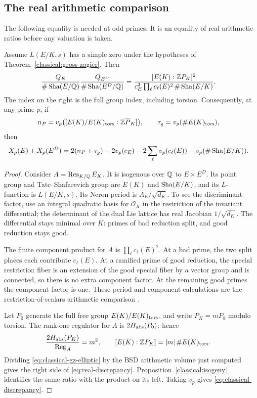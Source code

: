 \subsection{The real arithmetic comparison}

The following equality is needed at odd primes. It is an equality
of real arithmetic ratios before any valuation is taken.

\begin{proposition}
\label{classical:discrepancy-identity}
Assume $L(E/K,s)$ has a simple zero under the hypotheses of
Theorem~\ref{classical:gross-zagier}. Then
\begin{equation}\label{eq:real-discrepancy}
 \frac{Q_E}{\#\operatorname{Sha}(E/\mathbb Q)}
 \frac{Q_{E^D}}{\#\operatorname{Sha}(E^D/\mathbb Q)}
 =\frac{[E(K):\mathbb Z P_K]^2}
 {c_E^2\prod_\ell c_\ell(E)^2\,\#\operatorname{Sha}(E/K)}.
\end{equation}
The index on the right is the full group index, including torsion.
Consequently, at any prime $p$, if
\[
 n_P=v_p\bigl([E(K)/E(K)_{\rm tors}:\mathbb Z\overline P_K]\bigr),
 \qquad \tau_g=v_p(\#E(K)_{\rm tors}),
\]
then
\begin{equation}\label{eq:classical-discrepancy}
 X_p(E)+X_p(E^D)
 =2(n_P+\tau_g)-2v_p(c_E)
             -2\sum_\ell v_p(c_\ell(E))-v_p(\#\operatorname{Sha}(E/K)).
\end{equation}
\end{proposition}

\begin{proof}
Consider $A=\operatorname{Res}_{K/\mathbb Q}E_K$. It is isogenous over
$\mathbb Q$ to $E\times E^D$. Its point group and Tate--Shafarevich group
are $E(K)$ and $\operatorname{Sha}(E/K)$, and its $L$-function is $L(E/K,s)$.
Its Neron period is $A_E/\sqrt{d_K}$. To see the discriminant
factor, use an integral quadratic basis for $\mathcal O_K$ in the
restriction of the invariant differential; the determinant of the
dual Lie lattice has real Jacobian $1/\sqrt{d_K}$.
The differential stays minimal over $K$: primes of bad reduction
split, and good reduction stays good.

The finite component product for $A$ is
$\prod_\ell c_\ell(E)^2$. At a bad prime, the two split places
each contribute $c_\ell(E)$. At a ramified prime of good reduction,
the special restriction fiber is an extension of the good special
fiber by a vector group and is connected, so there is no extra
component factor. At the remaining good primes the component
factor is one. These period and component calculations are the
restriction-of-scalars arithmetic comparison
\cite{MilneBSD,B}.

Let $P_0$ generate the full free group $E(K)/E(K)_{\rm tors}$,
and write $P_K=mP_0$ modulo torsion. The rank-one regulator for
$A$ is $2H_{\rm abs}(P_0)$; hence
\[
 \frac{2H_{\rm abs}(P_K)}{\operatorname{Reg}_A}=m^2,
 \qquad [E(K):\mathbb Z P_K]=|m|\,\#E(K)_{\rm tors}.
\]
Dividing \eqref{eq:classical-gz-elliptic} by the BSD arithmetic
volume just computed gives the right side of
\eqref{eq:real-discrepancy}. Proposition~\ref{classical:isogeny}
identifies the same ratio with the product on its left. Taking
$v_p$ gives \eqref{eq:classical-discrepancy}.
\end{proof}

